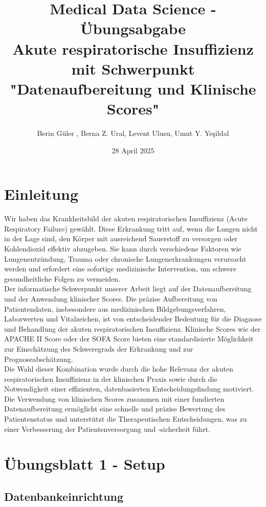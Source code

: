 \documentclass[12pt]{article}
\title{Medical Data Science - Übungsabgabe \\ Akute respiratorische Insuffizienz mit Schwerpunkt "Datenaufbereitung und Klinische Scores"}
\author{
    Berin Güler , Berna Z. Ural, Levent Ulusu, Umut Y. Yeşildal \\
}
\date{28 April 2025}
\begin{document}
\maketitle

\newpage
\tableofcontents
\newpage

\section{Einleitung}

Wir haben das Krankheitsbild der akuten respiratorischen Insuffizienz (Acute Respiratory Failure) gewählt. Diese Erkrankung tritt auf, wenn die Lungen nicht in der Lage sind, den Körper mit ausreichend Sauerstoff zu versorgen oder Kohlendioxid effektiv abzugeben. Sie kann durch verschiedene Faktoren wie Lungenentzündung, Trauma oder chronische Lungenerkrankungen verursacht werden und erfordert eine sofortige medizinische Intervention, um schwere gesundheitliche Folgen zu vermeiden.\\

Der informatische Schwerpunkt unserer Arbeit liegt auf der Datenaufbereitung und der Anwendung klinischer Scores. Die präzise Aufbereitung von Patientendaten, insbesondere aus medizinischen Bildgebungsverfahren, Laborwerten und Vitalzeichen, ist von entscheidender Bedeutung für die Diagnose und Behandlung der akuten respiratorischen Insuffizienz. Klinische Scores wie der APACHE II Score oder der SOFA Score bieten eine standardisierte Möglichkeit zur Einschätzung des Schweregrads der Erkrankung und zur Prognoseabschätzung.\\

Die Wahl dieser Kombination wurde durch die hohe Relevanz der akuten respiratorischen Insuffizienz in der klinischen Praxis sowie durch die Notwendigkeit einer effizienten, datenbasierten Entscheidungsfindung motiviert. Die Verwendung von klinischen Scores zusammen mit einer fundierten Datenaufbereitung ermöglicht eine schnelle und präzise Bewertung des Patientenstatus und unterstützt die Therapeutischen Entscheidungen, was zu einer Verbesserung der Patientenversorgung und -sicherheit führt.\\

\section{Übungsblatt 1 - Setup}

\subsection{ Datenbankeinrichtung}
\end{document}
